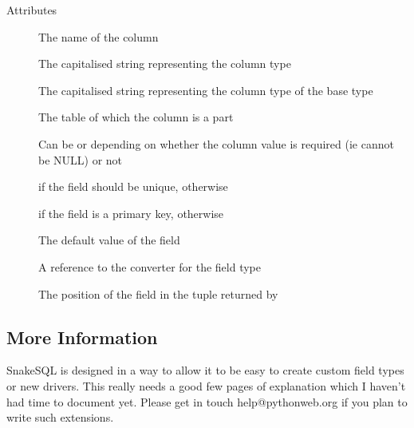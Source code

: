 \documentclass{howto}
\begin{document}
Attributes
\begin{description}
\item[]      
The name of the column
\item[]      
The capitalised string representing the column type
\item[]      
The capitalised string representing the column type of the base type
\item[]      
The table of which the column is a part
\item[]
Can be  or  depending on whether the column value is required (ie cannot be NULL) or not
\item[]      
 if the field should be unique,  otherwise
\item[]      
 if the field is a primary key,  otherwise
\item[]      
The default value of the field
\item[]      
A reference to the converter for the field type
\item[]      
The position of the field in the tuple returned by 
\end{description}

\subsection{More Information}

SnakeSQL is designed in a way to allow it to be easy to create custom field types or new drivers. This really needs a good few pages of explanation which I haven't had time to document yet. Please get in touch help@pythonweb.org if you plan to write such extensions.




\end{document}
